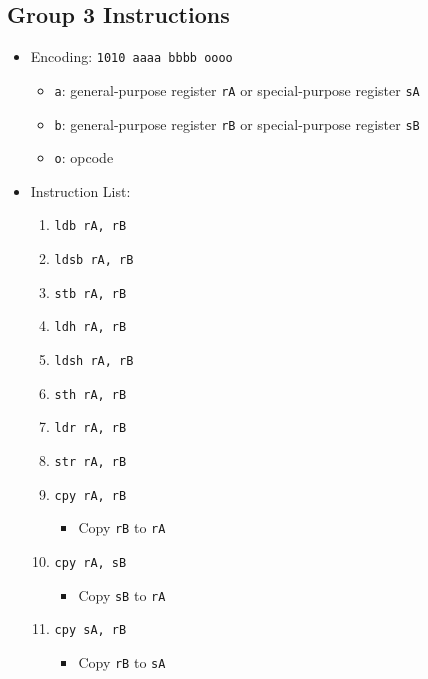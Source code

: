 \documentclass{article}
\begin{document}
	\subsection{Group 3 Instructions}
		\begin{itemize}
		\item Encoding:  \texttt{1010 aaaa bbbb oooo}
			\begin{itemize}
			\item \texttt{a}:  general-purpose register \texttt{rA} or
				special-purpose register \texttt{sA}
			\item \texttt{b}:  general-purpose register \texttt{rB} or
				special-purpose register \texttt{sB}
			\item \texttt{o}:  opcode
			\end{itemize}
		\item Instruction List:
			\begin{enumerate}
			\item \texttt{ldb rA, rB}
			\item \texttt{ldsb rA, rB}
			\item \texttt{stb rA, rB}
			\item \texttt{ldh rA, rB}

			\item \texttt{ldsh rA, rB}
			\item \texttt{sth rA, rB}
			\item \texttt{ldr rA, rB}
			\item \texttt{str rA, rB}

			\item \texttt{cpy rA, rB}
				\begin{itemize}
				\item Copy \texttt{rB} to \texttt{rA}
				\end{itemize}

			\item \texttt{cpy rA, sB}
				\begin{itemize}
				\item Copy \texttt{sB} to \texttt{rA}
				\end{itemize}
			\item \texttt{cpy sA, rB}
				\begin{itemize}
				\item Copy \texttt{rB} to \texttt{sA}
				\end{itemize}


\end{enumerate}
\end{itemize}
\end{document}
